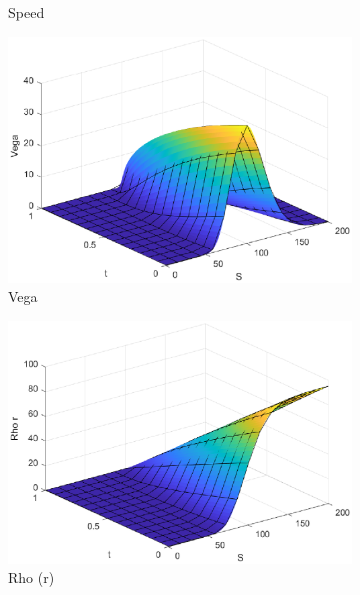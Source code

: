 \begin{figure}[H]
\begin{subfigure}[b]{0.35\linewidth}
        \caption{Speed}
    \end{subfigure}
    \begin{subfigure}[b]{0.35\linewidth}
        \includegraphics[width=\linewidth]{Imagenes/6_Sols/Call/Call_Vega.eps}
        \caption{Vega}
    \end{subfigure}
    \begin{subfigure}[b]{0.35\linewidth}
        \includegraphics[width=\linewidth]{Imagenes/6_Sols/Call/Call_Rho_r.eps}
        \caption{Rho (r)}
    \end{subfigure}
    \begin{subfigure}[b]{0.35\linewidth}

\end{subfigure}
\end{figure}
